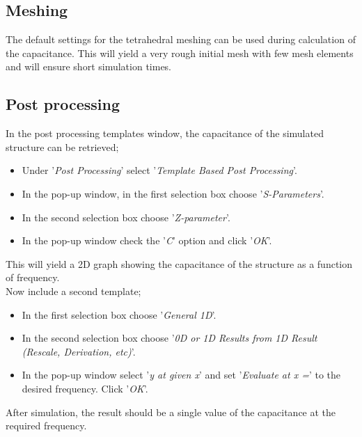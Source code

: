 \subsection{Meshing}
The default settings for the tetrahedral meshing can be used during calculation of the capacitance. This will yield a very rough initial mesh with few mesh elements and will ensure short simulation times.
\subsection{Post processing}
In the post processing templates window, the capacitance of the simulated structure can be retrieved; 
\begin{itemize}
	\item Under '\textit{Post Processing}' select '\textit{Template Based Post Processing}'.
	\item In the pop-up window, in the first selection box choose '\textit{S-Parameters}'.
	\item In the second selection box choose '\textit{Z-parameter}'.
	\item In the pop-up window check the '\textit{C}' option and click '\textit{OK}'.
\end{itemize}
This will yield a 2D graph showing the capacitance of the structure as a function of frequency. \\
Now include a second template;
\begin{itemize}
	\item In the first selection box choose '\textit{General 1D}'.
	\item In the second selection box choose '\textit{0D or 1D Results from 1D Result (Rescale, Derivation, etc)}'.
	\item In the pop-up window select '\textit{y at given x}' and set '\textit{Evaluate at x =}' to the desired frequency. Click '\textit{OK}'.
\end{itemize}
After simulation, the result should be a single value of the capacitance at the required frequency.

